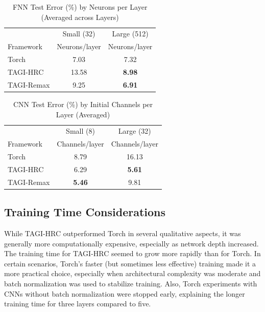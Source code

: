 \documentclass{article}
\begin{document}
\begin{table}[h]
\centering
\caption{FNN Test Error (\%) by Neurons per Layer (Averaged across Layers)}
\label{tab:fnn_neurons_impact}
\begin{small}
\begin{tabular}{lcc}
\toprule
 & Small (32) & Large (512) \\
Framework & Neurons/layer & Neurons/layer \\
\midrule
Torch      & 7.03 &  7.32 \\
TAGI-HRC   & 13.58         &  \textbf{8.98} \\
TAGI-Remax &  9.25         &  \textbf{6.91} \\
\bottomrule
\end{tabular}
\end{small}
\end{table}

\begin{table}[h]
\centering
\caption{CNN Test Error (\%) by Initial Channels per Layer (Averaged)}
\label{tab:cnn_channels_impact}
\begin{small}
\begin{tabular}{lcc}
\toprule
 & Small (8) & Large (32) \\
Framework & Channels/layer & Channels/layer \\
\midrule
Torch      & 8.79 & 16.13 \\
TAGI-HRC   &  6.29         &  \textbf{5.61} \\
TAGI-Remax &  \textbf{5.46}         &  9.81 \\
\bottomrule
\end{tabular}
\end{small}
\end{table}

\subsection{Training Time Considerations}
While TAGI-HRC outperformed Torch in several qualitative aspects, it was generally more computationally expensive, especially as network depth increased. The training time for TAGI-HRC seemed to grow more rapidly than for Torch. In certain scenarios, Torch’s faster (but sometimes less effective) training made it a more practical choice, especially when architectural complexity was moderate and batch normalization was used to stabilize training. Also, Torch experiments with CNNs without batch normalization were stopped early, explaining the longer training time for three layers compared to five.
\end{document}
